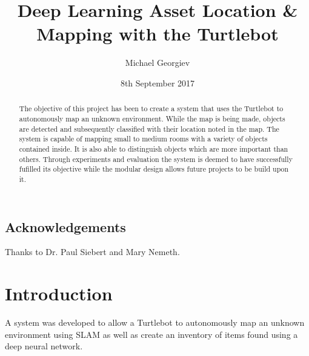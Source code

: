 \documentclass{mproj}
\begin{document}
\title{Deep Learning Asset Location \& Mapping with the Turtlebot}
\author{Michael Georgiev}
\date{8th September 2017}
\maketitle

\begin{abstract}

The objective of this project has been to create a system that uses the Turtlebot to autonomously map an unknown environment. While the map is being made, objects are detected and subsequently classified with their location noted in the map. The system is capable of mapping small to medium rooms with a variety of objects contained inside. It is also able to distinguish objects which are more important than others. Through experiments and evaluation the system is deemed to have successfully fufilled its objective while the modular design allows future projects to be build upon it.
\end{abstract}

\educationalconsent


\newpage
\section*{Acknowledgements}

Thanks to Dr. Paul Siebert and Mary Nemeth.

\tableofcontents

\chapter{Introduction}\label{intro}

A system was developed to allow a Turtlebot to autonomously map an unknown environment using SLAM as well as create an inventory of items found using a deep neural network.
\end{document}
